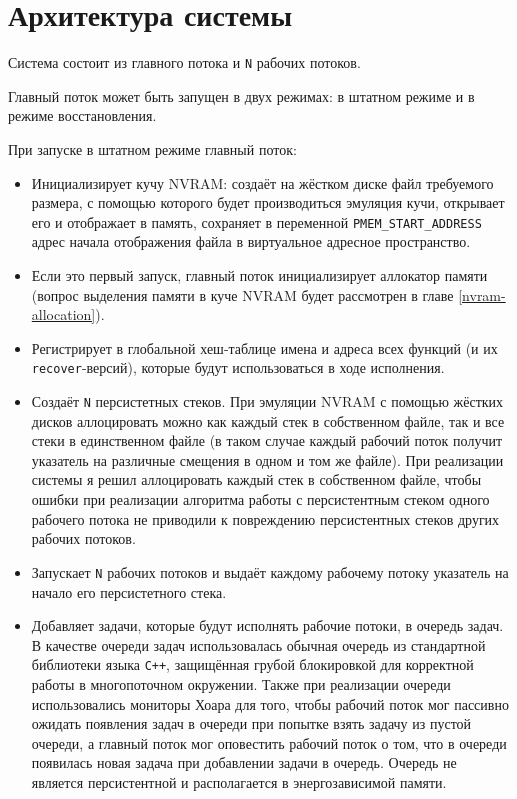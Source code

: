 \documentclass[times,specification,annotation]{itmo-student-thesis}
\begin{document}
\section{Архитектура системы}

Система состоит из главного потока и \texttt{N} рабочих потоков.

Главный поток может быть запущен в двух режимах: в штатном режиме и в режиме восстановления.

При запуске в штатном режиме главный поток:

\begin{itemize}
    \item Инициализирует кучу NVRAM: создаёт на жёстком диске файл требуемого размера, с помощью которого будет производиться эмуляция кучи, открывает его и отображает в память, сохраняет в переменной \texttt{PMEM\_START\_ADDRESS} адрес начала отображения файла в виртуальное адресное пространство.
    
    \item Если это первый запуск, главный поток инициализирует аллокатор памяти (вопрос выделения памяти в куче NVRAM будет рассмотрен в главе \ref{nvram-allocation}).
    
    \item Регистрирует в глобальной хеш-таблице имена и адреса всех функций (и их \texttt{recover}-версий), которые будут использоваться в ходе исполнения.
    
    \item Создаёт \texttt{N} персистетных стеков. При эмуляции NVRAM с помощью жёстких дисков аллоцировать можно как каждый стек в собственном файле, так и все стеки в единственном файле (в таком случае каждый рабочий поток получит указатель на различные смещения в одном и том же файле). При реализации системы я решил аллоцировать каждый стек в собственном файле, чтобы ошибки при реализации алгоритма работы с персистентным стеком одного рабочего потока не приводили к повреждению персистентных стеков других рабочих потоков.
    
    \item Запускает \texttt{N} рабочих потоков и выдаёт каждому рабочему потоку указатель на начало его персистетного стека.
    
    \item Добавляет задачи, которые будут исполнять рабочие потоки, в очередь задач. В качестве очереди задач использовалась обычная очередь из стандартной библиотеки языка \texttt{C++}, защищённая грубой блокировкой для корректной работы в многопоточном окружении. Также при реализации очереди использовались мониторы Хоара \cite{hoare-monitor} для того, чтобы рабочий поток мог пассивно ожидать появления задач в очереди при попытке взять задачу из пустой очереди, а главный поток мог оповестить рабочий поток о том, что в очереди появилась новая задача при добавлении задачи в очередь. Очередь не является персистентной и располагается в энергозависимой памяти.
\end{itemize}
\end{document}
